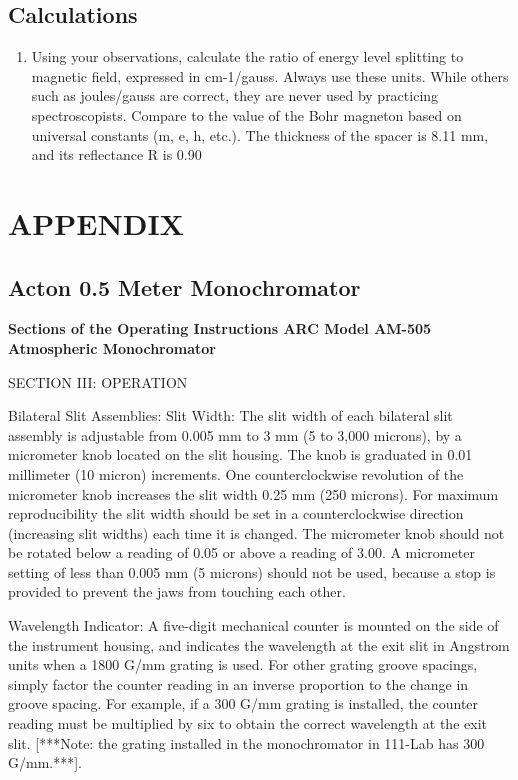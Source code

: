 \documentclass{../lab}
\begin{document}
\subsection{Calculations}

\begin{enumerate}
    \item Using your observations, calculate the ratio of energy level splitting to magnetic field, expressed in cm-1/gauss. Always use these units. While others such as joules/gauss are correct, they are never used by practicing spectroscopists. Compare to the value of the Bohr magneton based on universal constants (m, e, h, etc.). The thickness of the spacer is 8.11 mm, and its reflectance R is 0.90

\end{enumerate}

\section{APPENDIX}

\subsection{Acton 0.5 Meter Monochromator}

\textbf{Sections of the Operating Instructions ARC Model AM-505 Atmospheric Monochromator}

SECTION III: OPERATION

Bilateral Slit Assemblies: Slit Width: The slit width of each bilateral slit assembly is adjustable from 0.005 mm to 3 mm (5 to 3,000 microns), by a micrometer knob located on the slit housing. The knob is graduated in 0.01 millimeter (10 micron) increments. One counterclockwise revolution of the micrometer knob increases the slit width 0.25 mm (250 microns). For maximum reproducibility the slit width should be set in a counterclockwise direction (increasing slit widths) each time it is changed. The micrometer knob should not be rotated below a reading of 0.05 or above a reading of 3.00. A micrometer setting of less than 0.005 mm (5 microns) should not be used, because a stop is provided to prevent the jaws from touching each other.

Wavelength Indicator: A five-digit mechanical counter is mounted on the side of the instrument housing, and indicates the wavelength at the exit slit in Angstrom units when a 1800 G/mm grating is used. For other grating groove spacings, simply factor the counter reading in an inverse proportion to the change in groove spacing. For example, if a 300 G/mm grating is installed, the counter reading must be multiplied by six to obtain the correct wavelength at the exit slit. [***Note: the grating installed in the monochromator in 111-Lab has 300 G/mm.***].
\end{document}
